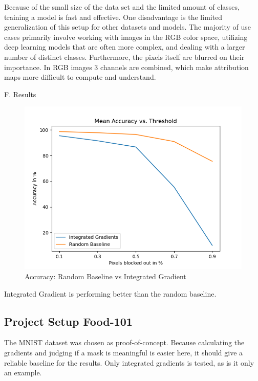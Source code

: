 Because of the small size of the data set and the limited amount of classes, training a model is fast and effective. One disadvantage is the limited generalization of this setup for other datasets and models. The majority of use cases primarily involve working with images in the RGB color space, utilizing deep learning models that are often more complex, and dealing with a larger number of distinct classes. Furthermore, the pixels itself are blurred on their importance. In RGB images 3 channels are combined, which make attribution maps more difficult to compute and understand.

F. Results

\begin{figure}[h!]
	\centering
	\includegraphics[width=150mm]{figs/mean_accuracy_vs_threshold}
	\caption{Accuracy: Random Baseline vs Integrated Gradient}
	\label{fig:Accuracy}
	
\end{figure}

Integrated Gradient is performing better than the random baseline.


\subsection{Project Setup Food-101}

The MNIST dataset \cite{deng2012mnist} was chosen as proof-of-concept. Because calculating the gradients and judging if a mask is meaningful is easier here, it should give a reliable baseline for the results. Only integrated gradients is tested, as is it only an example. 

